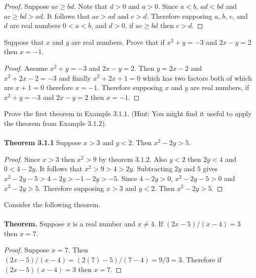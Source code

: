 \begin{proof}
    Suppose $ac \ge bd$. Note that $d > 0$ and $a > 0$. Since $a < b$, $ad < bd$ and $ac \ge bd > ad$. It follows
    that $ac > ad$ and $c > d$. Therefore supposing $a$, $b$, $c$, and $d$ are real numbers $0 < a < b$, and $d > 0$,
    if $ac \ge bd$ then $c > d$.
\end{proof}

\begin{tcolorbox}[title=Problem 14, breakable]
    Suppose that $x$ and $y$ are real numbers. Prove that if $x^2 + y = -3$ and 
    $2x - y = 2$ then $x= -1$.
\end{tcolorbox}

\begin{proof}
    Assume $x^2 + y = -3$ and $2x - y = 2$. Then $y = 2x - 2$ and 
    $x^2 + 2x - 2 = -3$ and finally $x^2 + 2x + 1 = 0$ which has two factors 
    both of which are $x + 1 = 0$ therefore $x = -1$. Therefore supposing 
    $x$ and $y$ are real numbers, if $x^2 + y = -3$ and 
    $2x - y = 2$ then $x= -1$.
\end{proof}

\begin{tcolorbox}[title=Problem 15, breakable]
    Prove the first theorem in Example $3.1.1$. (Hint: You might find it useful
    to apply the theorem from Example $3.1.2$). \\ \\
    \textbf{Theorem 3.1.1} Suppose $x > 3$ and $y < 2$. Then $x^2 - 2y > 5$.
\end{tcolorbox}

\begin{proof}
    Since $x > 3$ then $x^2 > 9$ by theorem $3.1.2$. 
    Also $y < 2$ then $2y < 4$ and $0 < 4 - 2y$.
    It follows that $x^2 > 9 > 4 > 2y$. Subtracting $2y$ and $5$ gives 
    $x^2 - 2y - 5 > 4 - 2y > -1 - 2y > -5$. Since $4 - 2y > 0$, 
    $x^2 - 2y - 5 > 0$ and $x^2 - 2y > 5$. Therefore supposing
    $x > 3$ and $y < 2$. Then $x^2 - 2y > 5$.
\end{proof}

\begin{tcolorbox}[title=Problem 16, breakable]
    Consider the following theorem. \\ \\
    \textbf{Theorem.} Suppose $x$ is a real number and $x \not = 4$. If 
    $(2x - 5)/(x - 4) = 3$ then $x = 7$.
    \begin{proof}
        Suppose $x = 7$. Then $(2x - 5)/(x - 4) = (2(7) - 5)/(7 - 4) = 9/3 = 3$.
        Therefore if $(2x - 5)(x - 4) = 3$ then $x = 7$.
    \end{proof}
\end{tcolorbox}

